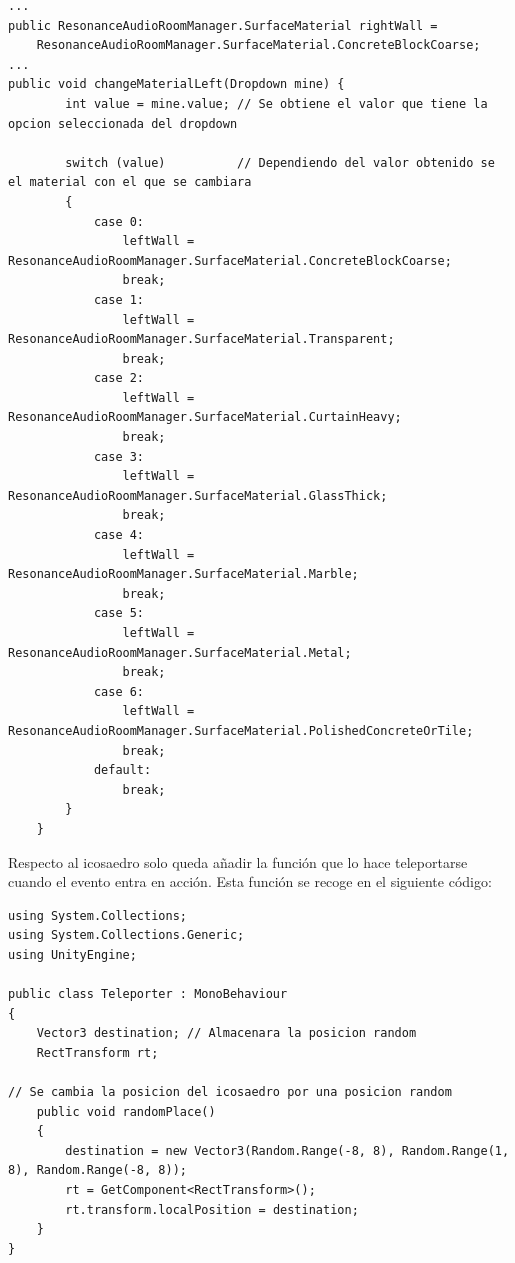 \lstset{language=[sharp]C, breaklines=true, basicstyle=\footnotesize}
\begin{lstlisting}[frame=single, caption={Función changeMaterialLeft}]
...
public ResonanceAudioRoomManager.SurfaceMaterial rightWall =
	ResonanceAudioRoomManager.SurfaceMaterial.ConcreteBlockCoarse;
...
public void changeMaterialLeft(Dropdown mine) {
        int value = mine.value;	// Se obtiene el valor que tiene la opcion seleccionada del dropdown

        switch (value)			// Dependiendo del valor obtenido se el material con el que se cambiara 
        {
            case 0:
                leftWall = ResonanceAudioRoomManager.SurfaceMaterial.ConcreteBlockCoarse;
                break;
            case 1:
                leftWall = ResonanceAudioRoomManager.SurfaceMaterial.Transparent;
                break;
            case 2:
                leftWall = ResonanceAudioRoomManager.SurfaceMaterial.CurtainHeavy;
                break;
            case 3:
                leftWall = ResonanceAudioRoomManager.SurfaceMaterial.GlassThick;
                break;
            case 4:
                leftWall = ResonanceAudioRoomManager.SurfaceMaterial.Marble;
                break;
            case 5:
                leftWall = ResonanceAudioRoomManager.SurfaceMaterial.Metal;
                break;
            case 6:
                leftWall = ResonanceAudioRoomManager.SurfaceMaterial.PolishedConcreteOrTile;
                break;
            default:
                break;
        }
    }

\end{lstlisting}



\quad Respecto al icosaedro solo queda añadir la función que lo hace teleportarse cuando el evento entra en acción. Esta función se recoge en el siguiente código:\\

\lstset{language=[sharp]C, breaklines=true, basicstyle=\footnotesize}
\begin{lstlisting}[frame=single, caption={Teleporter.cs}]
using System.Collections;
using System.Collections.Generic;
using UnityEngine;

public class Teleporter : MonoBehaviour
{
    Vector3 destination; // Almacenara la posicion random
    RectTransform rt;
    
// Se cambia la posicion del icosaedro por una posicion random
    public void randomPlace()
    {
        destination = new Vector3(Random.Range(-8, 8), Random.Range(1, 8), Random.Range(-8, 8));
        rt = GetComponent<RectTransform>();
        rt.transform.localPosition = destination;
    }
}

\end{lstlisting}

